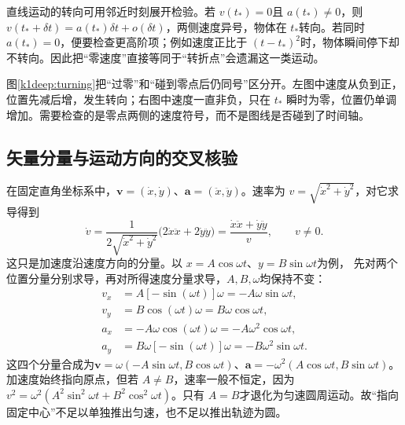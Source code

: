 直线运动的转向可用邻近时刻展开检验。若 $v(t_*)=0$且 $a(t_*)\ne0$，则 $v(t_*+\delta t)=a(t_*)\delta t+o(\delta t)$，两侧速度异号，物体在 $t_*$转向。若同时 $a(t_*)=0$，便要检查更高阶项；例如速度正比于 $(t-t_*)^2$时，物体瞬间停下却不转向。因此把“零速度”直接等同于“转折点”会遗漏这一类运动。


图\ref{k1deep:turning}把“过零”和“碰到零点后仍同号”区分开。左图中速度从负到正，位置先减后增，发生转向；右图中速度一直非负，只在 $t_*$ 瞬时为零，位置仍单调增加。需要检查的是零点两侧的速度符号，而不是图线是否碰到了时间轴。


\subsection{矢量分量与运动方向的交叉核验}
在固定直角坐标系中，$\bm v=(\dot x,\dot y)$、$\bm a=(\ddot x,\ddot y)$。速率为 $v=\sqrt{\dot x^2+\dot y^2}$，对它求导得到
\[\dot v=\frac{1}{2\sqrt{\dot x^2+\dot y^2}}
\bigl(2\dot x\ddot x+2\dot y\ddot y\bigr)
=\frac{\dot x\ddot x+\dot y\ddot y}{v},\qquad v\ne0.\]
这只是加速度沿速度方向的分量。以 $x=A\cos\omega t$、$y=B\sin\omega t$为例，
先对两个位置分量分别求导，再对所得速度分量求导，$A,B,\omega$均保持不变：
\begin{align*}
v_x&=A[-\sin(\omega t)]\omega=-A\omega\sin\omega t,\\
v_y&=B\cos(\omega t)\omega=B\omega\cos\omega t,\\
a_x&=-A\omega\cos(\omega t)\omega=-A\omega^2\cos\omega t,\\
a_y&=B\omega[-\sin(\omega t)]\omega=-B\omega^2\sin\omega t.
\end{align*}
这四个分量合成为$\bm v=\omega(-A\sin\omega t,B\cos\omega t)$、$\bm a=-\omega^2(A\cos\omega t,B\sin\omega t)$。
加速度始终指向原点，但若 $A\ne B$，速率一般不恒定，因为 $v^2=\omega^2(A^2\sin^2\omega t+B^2\cos^2\omega t)$。只有 $A=B$才退化为匀速圆周运动。故“指向固定中心”不足以单独推出匀速，也不足以推出轨迹为圆。


